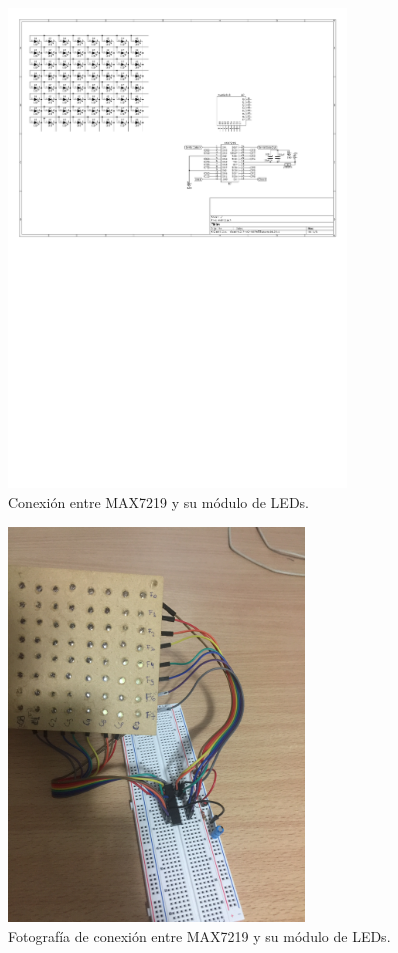 \begin{figure}[ht!]
\centering
\begin{center}
	\includegraphics[width=0.8\textwidth]{imagenes/hw/conexion-MAX-matriz.pdf}
	\caption{Conexión entre MAX7219 y su módulo de LEDs.}
	\label{fig:MAX-matriz}
\end{center}
\end{figure}

\begin{figure}[ht!]
\centering
\begin{center}
	\includegraphics[width=0.7\textwidth]{imagenes/hw/conexion-MAX-matriz.JPG}
	\caption{Fotografía de conexión entre MAX7219 y su módulo de LEDs.}
	\label{fig:MAX-matriz-real}
\end{center}
\end{figure}



